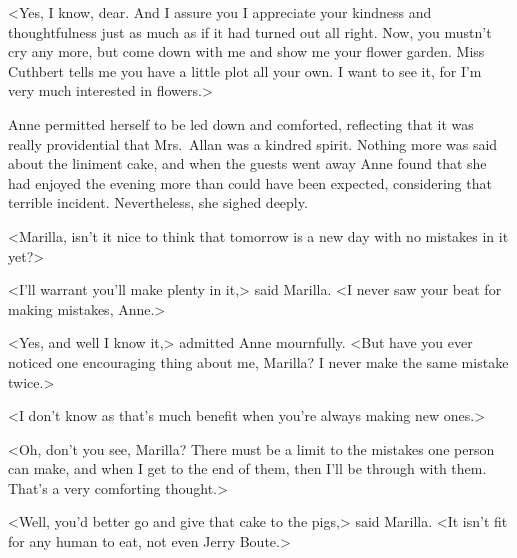 <Yes, I know, dear. And I assure you I appreciate your kindness and thoughtfulness just as much as if it had turned out all right. Now, you mustn't cry any more, but come down with me and show me your flower garden. Miss Cuthbert tells me you have a little plot all your own. I want to see it, for I'm very much interested in flowers.>

Anne permitted herself to be led down and comforted, reflecting that it was really providential that Mrs.~Allan was a kindred spirit. Nothing more was said about the liniment cake, and when the guests went away Anne found that she had enjoyed the evening more than could have been expected, considering that terrible incident. Nevertheless, she sighed deeply.

<Marilla, isn't it nice to think that tomorrow is a new day with no mistakes in it yet?>

<I'll warrant you'll make plenty in it,> said Marilla. <I never saw your beat for making mistakes, Anne.>

<Yes, and well I know it,> admitted Anne mournfully. <But have you ever noticed one encouraging thing about me, Marilla? I never make the same mistake twice.>

<I don't know as that's much benefit when you're always making new ones.>

<Oh, don't you see, Marilla? There must be a limit to the mistakes one person can make, and when I get to the end of them, then I'll be through with them. That's a very comforting thought.>

<Well, you'd better go and give that cake to the pigs,> said Marilla. <It isn't fit for any human to eat, not even Jerry Boute.>